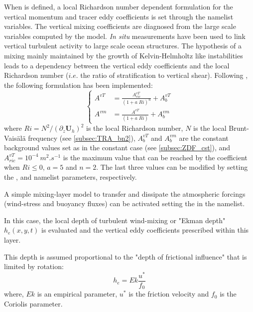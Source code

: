 \documentclass[../tex_main/NEMO_manual]{subfiles}
\begin{document}
When  is defined, a local Richardson number dependent formulation for the vertical momentum and
tracer eddy coefficients is set through the  namelist variables.
The vertical mixing coefficients are diagnosed from the large scale variables computed by the model. 
\textit{In situ} measurements have been used to link vertical turbulent activity to large scale ocean structures.
The hypothesis of a mixing mainly maintained by the growth of Kelvin-Helmholtz like instabilities leads to
a dependency between the vertical eddy coefficients and the local Richardson number
($i.e.$ the ratio of stratification to vertical shear).
Following \citet{Pacanowski_Philander_JPO81}, the following formulation has been implemented:
\begin{equation} \label{eq:zdfric}
   \left\{      \begin{aligned}
         A^{vT} &= \frac {A_{ric}^{vT}}{\left( 1+a \; Ri \right)^n} + A_b^{vT}       \\
         A^{vm} &= \frac{A^{vT}        }{\left( 1+ a \;Ri  \right)   } + A_b^{vm}
   \end{aligned}    \right.
\end{equation}
where $Ri = N^2 / \left(\partial_z \textbf{U}_h \right)^2$ is the local Richardson number,
$N$ is the local Brunt-Vais\"{a}l\"{a} frequency (see \autoref{subsec:TRA_bn2}), 
$A_b^{vT} $ and $A_b^{vm}$ are the constant background values set as in the constant case
(see \autoref{subsec:ZDF_cst}), and $A_{ric}^{vT} = 10^{-4}~m^2.s^{-1}$ is the maximum value that
can be reached by the coefficient when $Ri\leq 0$, $a=5$ and $n=2$.
The last three values can be modified by setting the ,  and
 namelist parameters, respectively.

A simple mixing-layer model to transfer and dissipate the atmospheric forcings
(wind-stress and buoyancy fluxes) can be activated setting the  in the namelist.

In this case, the local depth of turbulent wind-mixing or "Ekman depth" $h_{e}(x,y,t)$ is evaluated and
the vertical eddy coefficients prescribed within this layer.

This depth is assumed proportional to the "depth of frictional influence" that is limited by rotation:
\begin{equation}
h_{e} = Ek \frac {u^{*}} {f_{0}}
\end{equation}
where, $Ek$ is an empirical parameter, $u^{*}$ is the friction velocity and $f_{0}$ is the Coriolis parameter.
\end{document}
